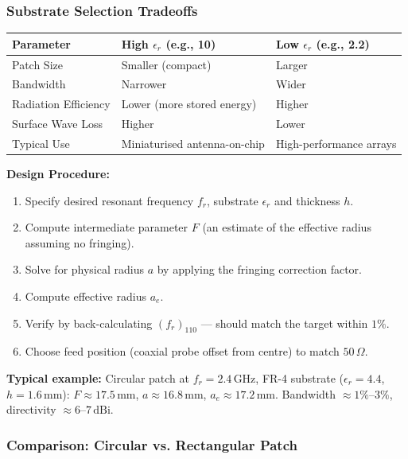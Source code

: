 \documentclass[12pt,a4paper]{article}
\renewcommand{\arraystretch}{1.45}
\begin{document}
\subsubsection*{Substrate Selection Tradeoffs}

\par\noindent
{\renewcommand{\arraystretch}{1.55}
\begin{tabularx}{\linewidth}{|B{3.0cm}|Y|Y|}
\hline
\textbf{Parameter} & \textbf{High $\epsilon_r$ (e.g., 10)} & \textbf{Low $\epsilon_r$ (e.g., 2.2)} \\
\hline
Patch Size & Smaller (compact) & Larger \\
\hline
Bandwidth & Narrower & Wider \\
\hline
Radiation Efficiency & Lower (more stored energy) & Higher \\
\hline
Surface Wave Loss & Higher & Lower \\
\hline
Typical Use & Miniaturised antenna-on-chip & High-performance arrays \\
\hline
\end{tabularx}}

\textbf{Design Procedure:}
\begin{enumerate}[label=\textbf{\arabic*.}, leftmargin=*, itemsep=3pt]
  \item Specify desired resonant frequency $f_r$, substrate $\epsilon_r$ and thickness $h$.
  \item Compute intermediate parameter $F$ (an estimate of the effective radius assuming no fringing).
  \item Solve for physical radius $a$ by applying the fringing correction factor.
  \item Compute effective radius $a_e$.
  \item Verify by back-calculating $(f_r)_{110}$ — should match the target within $1\%$.
  \item Choose feed position (coaxial probe offset from centre) to match $50\,\Omega$.
\end{enumerate}

\textbf{Typical example:} Circular patch at $f_r = 2.4\,\text{GHz}$, FR-4 substrate ($\epsilon_r = 4.4$, $h = 1.6\,\text{mm}$):
$F \approx 17.5\,\text{mm}$, $a \approx 16.8\,\text{mm}$, $a_e \approx 17.2\,\text{mm}$.
Bandwidth $\approx 1\%$–$3\%$, directivity $\approx 6$–$7\,\text{dBi}$.

\subsubsection*{Comparison: Circular vs. Rectangular Patch}
\end{document}
